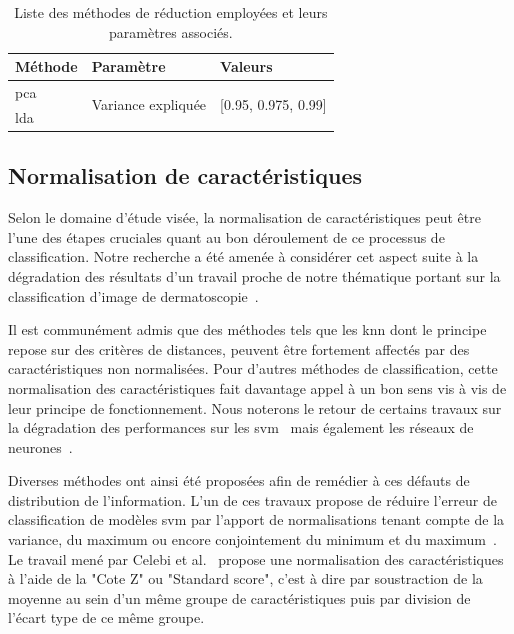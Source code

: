 \begin{table}[H]
    \centering
    \begin{tabular*}{0.6\linewidth}{lll}
    \toprule
    \textbf{Méthode}       & \textbf{Paramètre}                 & \textbf{Valeurs}                      \\ \midrule
    \gls{pca}              & \multirow{2}{*}{Variance expliquée}& \multirow{2}{*}{[0.95, 0.975, 0.99]}  \\ \cline{1-1}
    \gls{lda}              &                                    &                                       \\ 
    \bottomrule
    \end{tabular*}
    \caption{Liste des méthodes de réduction employées et leurs paramètres associés.}
    \label{tab:summary_reduction_methods}
\end{table}\par

\subsection{Normalisation de caractéristiques}
\label{subsec:features_normalisation}
Selon le domaine d'étude visée, la normalisation de caractéristiques peut être l'une des étapes cruciales quant au bon déroulement de ce processus de classification. Notre recherche a été amenée à considérer cet aspect suite à la dégradation des résultats d'un travail proche de notre thématique portant sur la classification d'image de dermatoscopie~\cite{Celebi2007}.\par

Il est communément admis que des méthodes tels que les \gls{knn} dont le principe repose sur des critères de distances, peuvent être fortement affectés par des caractéristiques non normalisées. Pour d'autres méthodes de classification, cette normalisation des caractéristiques fait davantage appel à un bon sens vis à vis de leur principe de fonctionnement. Nous noterons le retour de certains travaux sur la dégradation des performances sur les \gls{svm}~\cite{Juszczak2002} mais également les réseaux de neurones~\cite{Celebi2007}.\par

Diverses méthodes ont ainsi été proposées afin de remédier à ces défauts de distribution de l'information. L'un de ces travaux propose de réduire l'erreur de classification de modèles \gls{svm} par l'apport de normalisations tenant compte de la variance, du maximum ou encore conjointement du minimum et du maximum~\cite{Juszczak2002}. Le travail mené par Celebi et al.~\cite{Celebi2007} propose une normalisation des caractéristiques à l'aide de la "Cote Z" ou "Standard score", c'est à dire par soustraction de la moyenne au sein d'un même groupe de caractéristiques puis par division de l'écart type de ce même groupe.\par

